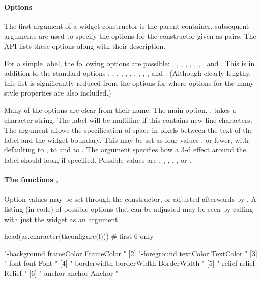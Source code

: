 \paragraph{Options}
The first argument of a widget constructor is the parent container,
subsequent arguments are used to specify the options for the
constructor given as  pairs. The \TK\/ API lists these
options along with their description.

For a simple label, the following options are possible: ,
, , , ,
, , , and .
This is in addition to the standard options ,
, , , ,
, , , ,
, and . (Although clearly lengthy, this
list is significantly reduced from the options for 
where options for the many style properties are also included.)

Many of the options are clear from their name.  The main option,
, takes a character string. The label will be multiline if
this contains new line characters.  The 
argument allows the specification of space in pixels between the text
of the label and the widget boundary. This may be set as four values
, or fewer, with 
defaulting to ,  to  and 
to . The  argument specifies how
a 3-d effect around the label should look, if specified. Possible
values are , , ,
, , or .

\paragraph{The functions , }
Option values may be set through the constructor, or adjusted
afterwards by . A listing (in \TCL\/ code) of possible options
that can be adjusted may be seen by calling 
with just the widget as an argument.

\begin{Schunk}
\begin{Sinput}
 head(as.character(tkconfigure(l)))      # first 6 only
\end{Sinput}
\begin{Soutput}
[1] "-background frameColor FrameColor {} {}"   
[2] "-foreground textColor TextColor {} {}"     
[3] "-font font Font {} {}"                     
[4] "-borderwidth borderWidth BorderWidth {} {}"
[5] "-relief relief Relief {} {}"               
[6] "-anchor anchor Anchor {} {}"               
\end{Soutput}
\end{Schunk}

